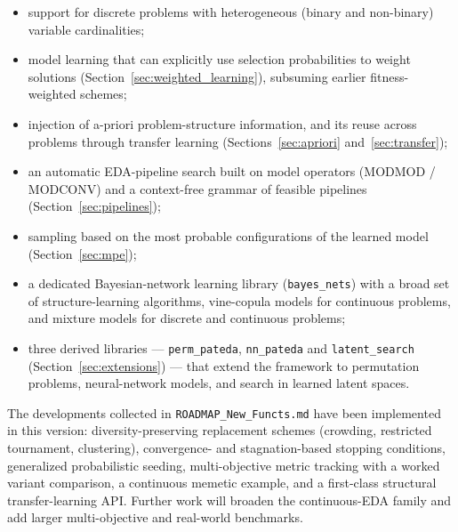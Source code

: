 \documentclass[a4paper,11pt]{article}
\begin{document}
\begin{itemize}
  \item support for discrete problems with heterogeneous (binary and non-binary)
    variable cardinalities;
  \item model learning that can explicitly use selection probabilities to weight
    solutions (Section~\ref{sec:weighted_learning}), subsuming earlier
    fitness-weighted schemes;
  \item injection of a-priori problem-structure information, and its reuse across
    problems through transfer learning (Sections~\ref{sec:apriori}
    and~\ref{sec:transfer});
  \item an automatic EDA-pipeline search built on model operators (MODMOD /
    MODCONV) and a context-free grammar of feasible pipelines
    (Section~\ref{sec:pipelines});
  \item sampling based on the most probable configurations of the learned model
    (Section~\ref{sec:mpe});
  \item a dedicated Bayesian-network learning library (\texttt{bayes\_nets}) with
    a broad set of structure-learning algorithms, vine-copula models for
    continuous problems, and mixture models for discrete and continuous problems;
  \item three derived libraries --- \texttt{perm\_pateda}, \texttt{nn\_pateda} and
    \texttt{latent\_search} (Section~\ref{sec:extensions}) --- that extend the
    framework to permutation problems, neural-network models, and search in
    learned latent spaces.
\end{itemize}

The developments collected in \texttt{ROADMAP\_New\_Functs.md} have been
implemented in this version: diversity-preserving replacement schemes (crowding,
restricted tournament, clustering), convergence- and stagnation-based stopping
conditions, generalized probabilistic seeding, multi-objective metric tracking
with a worked variant comparison, a continuous memetic example, and a
first-class structural transfer-learning API. Further work will broaden the
continuous-EDA family and add larger multi-objective and real-world benchmarks.



\end{document}
